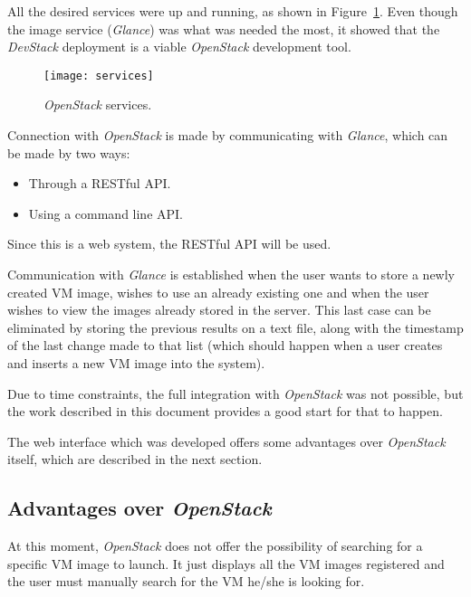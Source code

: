 All the desired services were up and running, as shown in Figure~\ref{fig:services}. Even though the image service (\textit{Glance}) was what was needed the most, it showed that the \textit{DevStack} deployment is a viable \textit{OpenStack} development tool.

\begin{figure}[h]
  \begin{center}
    \leavevmode
    \texttt{[image: services]}
    \caption{\textit{OpenStack} services.}
    \label{fig:services}
  \end{center}
\end{figure}

Connection with \textit{OpenStack} is made by communicating with \textit{Glance}, which can be made by two ways:

\begin{itemize}
\item Through a RESTful API.
\item Using a command line API.
\end{itemize} 

Since this is a web system, the RESTful API will be used.

Communication with \textit{Glance} is established when the user wants to store a newly created VM image, wishes to use an already existing one and when the user wishes to view the images already stored in the server. This last case can be eliminated by storing the previous results on a text file, along with the timestamp of the last change made to that list (which should happen when a user creates and inserts a new VM image into the system).

Due to time constraints, the full integration with \textit{OpenStack} was not possible, but the work described in this document provides a good start for that to happen.

The web interface which was developed offers some advantages over \textit{OpenStack} itself, which are described in the next section.

\clearpage
\subsection{Advantages over \textit{OpenStack}}

At this moment, \textit{OpenStack} does not offer the possibility of searching for a specific VM image to launch. It just displays all the VM images registered and the user must manually search for the VM he/she is looking for.


